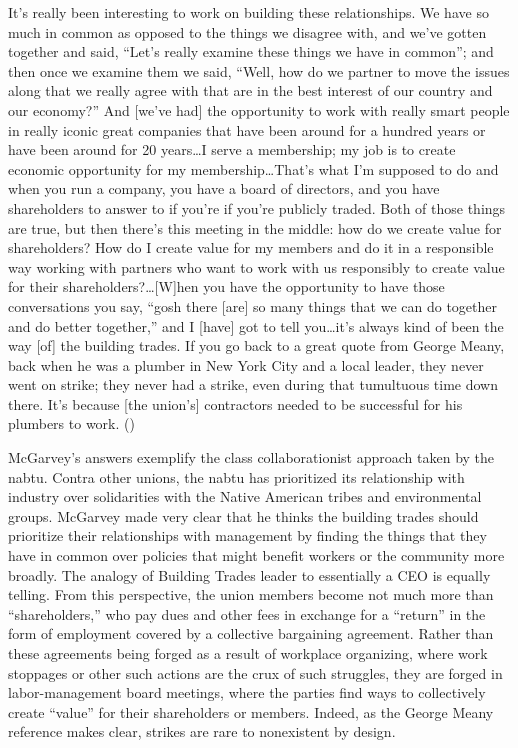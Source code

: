 \documentclass[12pt]{article}
\renewenvironment{quote}
  {\list{}{\leftmargin=\parindent\rightmargin=0pt}%
   \item\relax}
  {\endlist}
\begin{document}
\begin{quote}
It’s really been interesting to work on building these relationships. We have so much in common as opposed to the things we disagree with, and we've gotten together and said, “Let's really examine these things we have in common”; and then once we examine them we said, “Well, how do we partner to move the issues along that we really agree with that are in the best interest of our country and our economy?” And [we’ve had] the opportunity to work with really smart people in really iconic great companies that have been around for a hundred years or have been around for 20 years\ldots{}I serve a membership; my job is to create economic opportunity for my membership\ldots{}That's what I'm supposed to do and when you run a company, you have a board of directors, and you have shareholders to answer to if you're if you're publicly traded. Both of those things are true, but then there's this meeting in the middle: how do we create value for shareholders? How do I create value for my members and do it in a responsible way working with partners who want to work with us responsibly to create value for their shareholders?\ldots{}[W]hen you have the opportunity to have those conversations you say, “gosh there [are] so many things that we can do together and do better together,” and I [have] got to tell you\ldots{}it's always kind of been the way [of] the building trades. If you go back to a great quote from George Meany, back when he was a plumber in New York City and a local leader, they never went on strike; they never had a strike, even during that tumultuous time down there. It's because [the union’s] contractors needed to be successful for his plumbers to work. (\cite{natgasnowNextInfrastructureChallenge2015})
\end{quote}

\sloppy
McGarvey’s answers exemplify the class collaborationist approach taken by the \acrshort{nabtu}. Contra other unions, the \acrshort{nabtu} has prioritized its relationship with industry over solidarities with the Native American tribes and environmental groups. McGarvey made very clear that he thinks the building trades should prioritize their relationships with management by finding the things that they have in common over policies that might benefit workers or the community more broadly. The analogy of Building Trades leader to essentially a CEO is equally telling. From this perspective, the union members become not much more than “shareholders,” who pay dues and other fees in exchange for a “return” in the form of employment covered by a collective bargaining agreement. Rather than these agreements being forged as a result of workplace organizing, where work stoppages or other such actions are the crux of such struggles, they are forged in labor-management board meetings, where the parties find ways to collectively create “value” for their shareholders or members. Indeed, as the George Meany reference makes clear, strikes are rare to nonexistent by design.
\sloppypar
\end{document}
